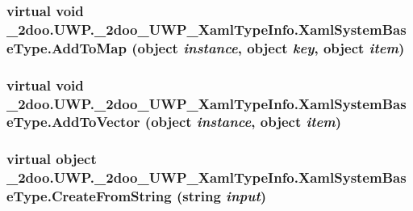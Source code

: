 \hypertarget{class__2doo_1_1_u_w_p_1_1__2doo___u_w_p___xaml_type_info_1_1_xaml_system_base_type_04b9426ea8d0f81463a9b53118ab5519}{
\subsubsection[{AddToMap}]{\setlength{\rightskip}{0pt plus 5cm}virtual void \_\-2doo.UWP.\_\-2doo\_\-UWP\_\-XamlTypeInfo.XamlSystemBaseType.AddToMap (object {\em instance}, \/  object {\em key}, \/  object {\em item})}}
\label{class__2doo_1_1_u_w_p_1_1__2doo___u_w_p___xaml_type_info_1_1_xaml_system_base_type_04b9426ea8d0f81463a9b53118ab5519}


\hypertarget{class__2doo_1_1_u_w_p_1_1__2doo___u_w_p___xaml_type_info_1_1_xaml_system_base_type_92cc8e8caee060a4f8d872b715f2b035}{
\subsubsection[{AddToVector}]{\setlength{\rightskip}{0pt plus 5cm}virtual void \_\-2doo.UWP.\_\-2doo\_\-UWP\_\-XamlTypeInfo.XamlSystemBaseType.AddToVector (object {\em instance}, \/  object {\em item})}}
\label{class__2doo_1_1_u_w_p_1_1__2doo___u_w_p___xaml_type_info_1_1_xaml_system_base_type_92cc8e8caee060a4f8d872b715f2b035}


\hypertarget{class__2doo_1_1_u_w_p_1_1__2doo___u_w_p___xaml_type_info_1_1_xaml_system_base_type_85cd0ab3fec92dd8c407564fe441c578}{
\subsubsection[{CreateFromString}]{\setlength{\rightskip}{0pt plus 5cm}virtual object \_\-2doo.UWP.\_\-2doo\_\-UWP\_\-XamlTypeInfo.XamlSystemBaseType.CreateFromString (string {\em input})}}
\label{class__2doo_1_1_u_w_p_1_1__2doo___u_w_p___xaml_type_info_1_1_xaml_system_base_type_85cd0ab3fec92dd8c407564fe441c578}


